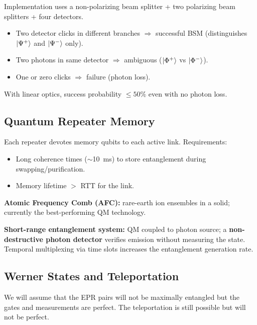 \documentclass[10pt,a4paper]{article}
\begin{document}
\begin{tcolorbox}[defstyle, title={Definition}]
Implementation uses a non-polarizing beam splitter + two polarizing beam splitters + four detectors.
\begin{itemize}[nosep]
\item Two detector clicks in different branches $\Rightarrow$ successful BSM (distinguishes $\ket{\Psi^+}$ and $\ket{\Psi^-}$ only).
\item Two photons in same detector $\Rightarrow$ ambiguous ($\ket{\Phi^+}$ vs $\ket{\Phi^-}$).
\item One or zero clicks $\Rightarrow$ failure (photon loss).
\end{itemize}
With linear optics, success probability $\leq 50\%$ even with no photon loss.
\end{tcolorbox}

\subsection{Quantum Repeater Memory}

\begin{tcolorbox}[defstyle, title={Definition}]
Each repeater devotes memory qubits to each active link. Requirements:
\begin{itemize}[nosep]
\item Long coherence times ($\sim$10~ms) to store entanglement during swapping/purification.
\item Memory lifetime $>$ RTT for the link.
\end{itemize}
\textbf{Atomic Frequency Comb (AFC):} rare-earth ion ensembles in a solid; currently the best-performing QM technology.

\textbf{Short-range entanglement system:} QM coupled to photon source; a \textbf{non-destructive photon detector} verifies emission without measuring the state. Temporal multiplexing via time slots increases the entanglement generation rate.
\end{tcolorbox}

\subsection{Werner States and Teleportation}

We will assume that the EPR pairs will not be maximally entangled but the gates and measurements are perfect. The teleportation is still possible but will not be perfect.
\end{document}
